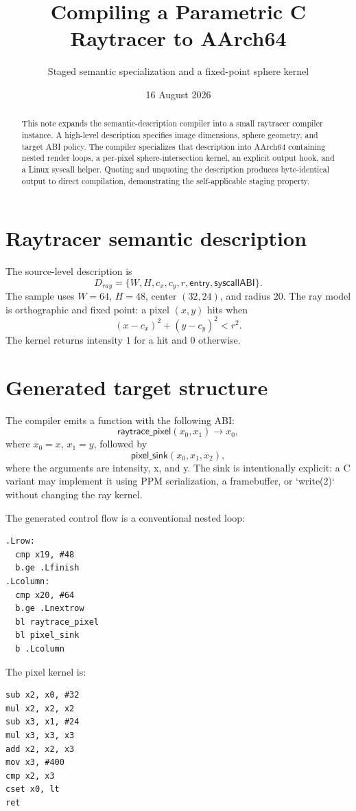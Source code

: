 \documentclass[11pt,a4paper]{article}
\title{Compiling a Parametric C Raytracer to AArch64}
\author{Staged semantic specialization and a fixed-point sphere kernel}
\date{16 August 2026}
\begin{document}
\maketitle
\begin{abstract}
This note expands the semantic-description compiler into a small raytracer compiler instance. A high-level description specifies image dimensions, sphere geometry, and target ABI policy. The compiler specializes that description into AArch64 containing nested render loops, a per-pixel sphere-intersection kernel, an explicit output hook, and a Linux syscall helper. Quoting and unquoting the description produces byte-identical output to direct compilation, demonstrating the self-applicable staging property.
\end{abstract}
\section{Raytracer semantic description}
The source-level description is
\[
D_{ray}=\{
W,H,c_x,c_y,r,\mathsf{entry},\mathsf{syscallABI}\}.
\]
The sample uses $W=64$, $H=48$, center $(32,24)$, and radius $20$. The ray model is orthographic and fixed point: a pixel $(x,y)$ hits when
\[
(x-c_x)^2+(y-c_y)^2<r^2.
\]
The kernel returns intensity $1$ for a hit and $0$ otherwise.

\section{Generated target structure}
The compiler emits a function with the following ABI:
\[
\mathsf{raytrace\_pixel}(x_0,x_1)\to x_0,
\]
where $x_0=x$, $x_1=y$, followed by
\[
\mathsf{pixel\_sink}(x_0,x_1,x_2),
\]
where the arguments are intensity, x, and y. The sink is intentionally explicit: a C variant may implement it using PPM serialization, a framebuffer, or `write(2)` without changing the ray kernel.

The generated control flow is a conventional nested loop:
\begin{verbatim}
.Lrow:
  cmp x19, #48
  b.ge .Lfinish
.Lcolumn:
  cmp x20, #64
  b.ge .Lnextrow
  bl raytrace_pixel
  bl pixel_sink
  b .Lcolumn
\end{verbatim}

The pixel kernel is:
\begin{verbatim}
sub x2, x0, #32
mul x2, x2, x2
sub x3, x1, #24
mul x3, x3, x3
add x2, x2, x3
mov x3, #400
cmp x2, x3
cset x0, lt
ret
\end{verbatim}
\end{document}

